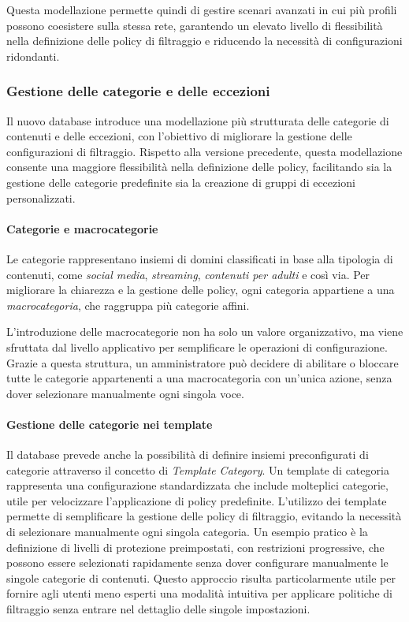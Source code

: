 Questa modellazione permette quindi di gestire scenari avanzati in cui più profili possono coesistere sulla stessa rete, garantendo un elevato livello di flessibilità nella definizione delle policy di filtraggio e riducendo la necessità di configurazioni ridondanti.

\subsubsection{Gestione delle categorie e delle eccezioni}
Il nuovo database introduce una modellazione più strutturata delle categorie di contenuti e delle eccezioni, con l'obiettivo di migliorare la gestione delle configurazioni di filtraggio. Rispetto alla versione precedente, questa modellazione consente una maggiore flessibilità nella definizione delle policy, facilitando sia la gestione delle categorie predefinite sia la creazione di gruppi di eccezioni personalizzati.

\paragraph{Categorie e macrocategorie}
Le categorie rappresentano insiemi di domini classificati in base alla tipologia di contenuti, come \emph{social media}, \emph{streaming}, \emph{contenuti per adulti} e così via. Per migliorare la chiarezza e la gestione delle policy, ogni categoria appartiene a una \emph{macrocategoria}, che raggruppa più categorie affini.

L'introduzione delle macrocategorie non ha solo un valore organizzativo, ma viene sfruttata dal livello applicativo per semplificare le operazioni di configurazione. Grazie a questa struttura, un amministratore può decidere di abilitare o bloccare tutte le categorie appartenenti a una macrocategoria con un'unica azione, senza dover selezionare manualmente ogni singola voce.

\paragraph{Gestione delle categorie nei template}
Il database prevede anche la possibilità di definire insiemi preconfigurati di categorie attraverso il concetto di \emph{Template Category}. Un template di categoria rappresenta una configurazione standardizzata che include molteplici categorie, utile per velocizzare l’applicazione di policy predefinite.
%
L’utilizzo dei template permette di semplificare la gestione delle policy di filtraggio, evitando la necessità di selezionare manualmente ogni singola categoria. Un esempio pratico è la definizione di livelli di protezione preimpostati, con restrizioni progressive, che possono essere selezionati rapidamente senza dover configurare manualmente le singole categorie di contenuti. Questo approccio risulta particolarmente utile per fornire agli utenti meno esperti una modalità intuitiva per applicare politiche di filtraggio senza entrare nel dettaglio delle singole impostazioni.

